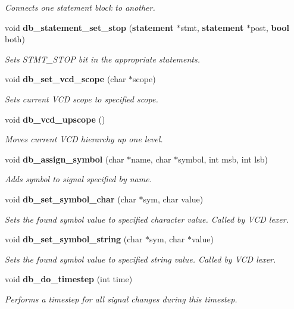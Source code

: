 \begin{CompactItemize}
\begin{CompactList}\small\item\em Connects one statement block to another. \item\end{CompactList}\item 
void {\bf db\_\-statement\_\-set\_\-stop} ({\bf statement} $\ast$stmt, {\bf statement} $\ast$post, {\bf bool} both)
\begin{CompactList}\small\item\em Sets STMT\_\-STOP bit in the appropriate statements. \item\end{CompactList}\item 
void {\bf db\_\-set\_\-vcd\_\-scope} (char $\ast$scope)
\begin{CompactList}\small\item\em Sets current VCD scope to specified scope. \item\end{CompactList}\item 
void {\bf db\_\-vcd\_\-upscope} ()
\begin{CompactList}\small\item\em Moves current VCD hierarchy up one level. \item\end{CompactList}\item 
void {\bf db\_\-assign\_\-symbol} (char $\ast$name, char $\ast$symbol, int msb, int lsb)
\begin{CompactList}\small\item\em Adds symbol to signal specified by name. \item\end{CompactList}\item 
void {\bf db\_\-set\_\-symbol\_\-char} (char $\ast$sym, char value)
\begin{CompactList}\small\item\em Sets the found symbol value to specified character value. Called by VCD lexer. \item\end{CompactList}\item 
void {\bf db\_\-set\_\-symbol\_\-string} (char $\ast$sym, char $\ast$value)
\begin{CompactList}\small\item\em Sets the found symbol value to specified string value. Called by VCD lexer. \item\end{CompactList}\item 
void {\bf db\_\-do\_\-timestep} (int time)
\begin{CompactList}\small\item\em Performs a timestep for all signal changes during this timestep. \item\end{CompactList}\end{CompactItemize}
